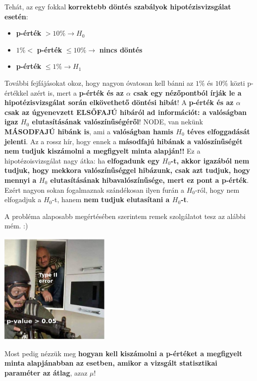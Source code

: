 \documentclass[
]{book}
\providecommand{\tightlist}{%
  \setlength{\itemsep}{0pt}\setlength{\parskip}{0pt}}
\begin{document}
Tehát, az egy fokkal \textbf{korrektebb döntés szabályok hipotézisvizsgálat esetén}:

\begin{itemize}
\tightlist
\item
  \textbf{p-érték} \(>10\% \rightarrow H_0\)
\item
  \(1\% <\) \textbf{p-érték} \(\leq 10\% \rightarrow\) \textbf{nincs döntés}
\item
  \textbf{p-érték} \(\leq1\% \rightarrow H_1\)
\end{itemize}

További fejfájásokat okoz, hogy nagyon óvatosan kell bánni az \(1\%\) és \(10\%\) közti p-értékkel azért is, mert a \textbf{p-érték és az \(\alpha\) csak egy nézőpontból írják le a hipotézisvizsgálat során elkövethető döntési hibát}! A \textbf{p-érték és az \(\alpha\) csak az úgyenevzett ELSŐFAJÚ hibáról ad információt: a valóságban igaz \(H_0\) elutasításának valószínűségéről}!
NODE, van nekünk \textbf{MÁSODFAJÚ hibánk is}, ami a \textbf{valóságban hamis \(H_0\) téves elfoggadását jelenti}. Az a rossz hír, hogy ennek a \textbf{másodfajú hibának a valószínűségét nem tudjuk kiszámolni a megfigyelt minta alapján!!}
Ez a hipotézoisvizsgálat nagy átka: ha \textbf{elfogadunk egy \(H_0\)-t, akkor igazából nem tudjuk, hogy mekkora valószínűséggel hibázunk, csak azt tudjuk, hogy mennyi a \(H_0\) elutasításának hibavalószínűsége, mert ez pont a p-érték}.
Ezért nagyon sokan fogalmaznak szándékosan ilyen furán a \(H_0\)-ról, hogy nem elfogadjuk a \(H_0\)-t, hanem \textbf{nem tudjuk elutasítani a \(H_0\)-t}.

A probléma alaposabb megértésében szerintem remek szolgálatot tesz az alábbi mém. :)

\includegraphics[width=0.4\textwidth,height=\textheight]{Type2.png}

Most pedig nézzük meg \textbf{hogyan kell kiszámolni a p-értéket a megfigyelt minta alapjánabban az esetben, amikor a vizsgált statisztikai paraméter az átlag}, azaz \(\mu\)!
\end{document}
